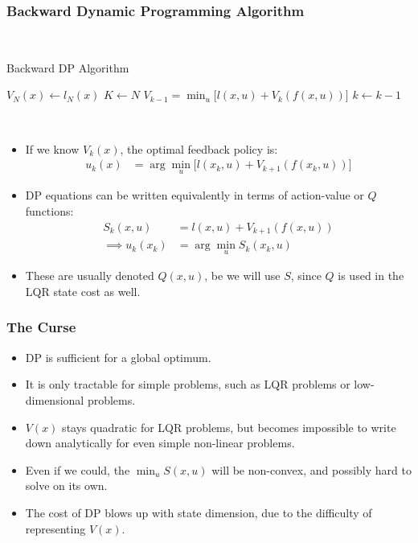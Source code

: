 \subsubsection{Backward Dynamic Programming Algorithm}

\\
\noindent
\begin{algorithm}
	\caption{Backward DP Algorithm}
	\label{alg:bdp}
	\begin{algorithmic}[1]	
        \State $V_N(x) \gets l_N(x)$
        \State $K \gets N$
            \State $V_{k-1} = \min_u \big[ l(x,u) + V_k(f(x,u))\big]$ 
            \State $k \gets k-1$
        \EndWhile
	\end{algorithmic}
\end{algorithm}
\\

\begin{itemize}
    \item If we know $V_k(x)$, the optimal feedback policy is: 
    \begin{align}
        u_{k}(x) &= \arg\min_u \big[ l(x_k,u) + V_{k+1}(f(x_{k},u)) \big]
    \end{align}
    \item DP equations can be written equivalently in terms of action-value or $Q$ functions:
    \begin{align}
        S_k(x,u) &= l(x,u) + V_{k+1} (f(x,u)) \\
        \implies u_k(x_k) &= \arg\min_u S_k(x_k,u)
    \end{align}
    \item These are usually denoted $Q(x,u)$, be we will use $S$, since $Q$ is used in the LQR state cost as well. 
\end{itemize}

\subsubsection{The Curse}
\begin{itemize}
    \item DP is sufficient for a global optimum. 
    \item It is only tractable for simple problems, such as LQR problems or low-dimensional problems. 
    \item $V(x)$ stays quadratic for LQR problems, but becomes impossible to write down analytically for even simple non-linear problems. 
    \item Even if we could, the $\min_u S(x,u)$ will be non-convex, and possibly hard to solve on its own. 
    \item The cost of DP blows up with state dimension, due to the difficulty of representing $V(x)$. 
\end{itemize}

